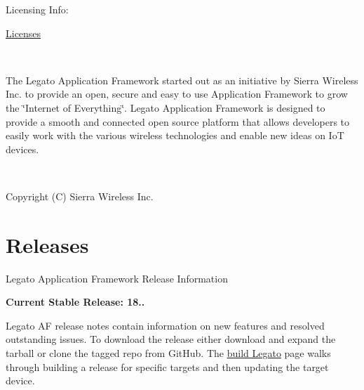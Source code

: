 \begin{center}Licensing Info\+:\end{center} 

\begin{center}\hyperlink{aboutLicenses}{Licenses}\end{center} 

\begin{center}~\newline
 ~\newline
\end{center} 

\begin{center}The Legato Application Framework started out as an initiative by Sierra Wireless Inc. to provide an open, secure and easy to use Application Framework to grow the \char`\"{}\+Internet of Everything\char`\"{}. Legato Application Framework is designed to provide a smooth and connected open source platform that allows developers to easily work with the various wireless technologies and enable new ideas on IoT devices.\end{center} 

\begin{center}~\newline
 ~\newline
 ~\newline
 ~\newline
\end{center} 

\begin{center}Copyright (C) Sierra Wireless Inc. \end{center}  \hypertarget{aboutReleaseInfo}{}\section{Releases}\label{aboutReleaseInfo}
Legato Application Framework Release Information

{\bfseries Current Stable Release\+: 18..}

Legato AF release notes contain information on new features and resolved outstanding issues. To download the release either download and expand the tarball or clone the tagged repo from Git\+Hub. The \hyperlink{basicBuildLegato}{build Legato} page walks through building a release for specific targets and then updating the target device.

